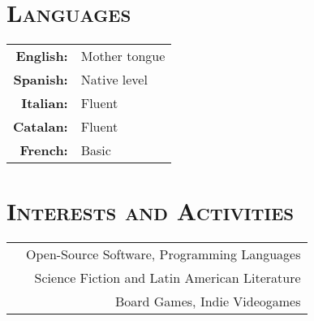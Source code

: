 \documentclass[a4paper,10pt]{article} %
\newcommand*{\justifyheading}{\raggedright}
\begin{document}
\begin{minipage}[t]{0.5\textwidth}
\section{\textsc{Languages}}
\smallskip
\begin{tabular}{rl}
 \textbf{English:} & Mother tongue  \\

 \textbf{Spanish:} & Native level  \\

 \textbf{Italian:} & Fluent  \\

 \textbf{Catalan:} & Fluent  \\

 \textbf{French:} & Basic
\end{tabular}
\end{minipage}\hspace{-0.01\textwidth}
%
%
\begin{minipage}[t]{0.505\textwidth}
\renewcommand{\justifyheading}{\raggedleft}
\section{\textsc{Interests and Activities}}
\smallskip
\begin{tabularx}{\textwidth}{Xr}
& Open-Source Software, Programming Languages\\
& Science Fiction and Latin American Literature \\
& Board Games, Indie Videogames
\end{tabularx}
\end{minipage}
\end{document}
